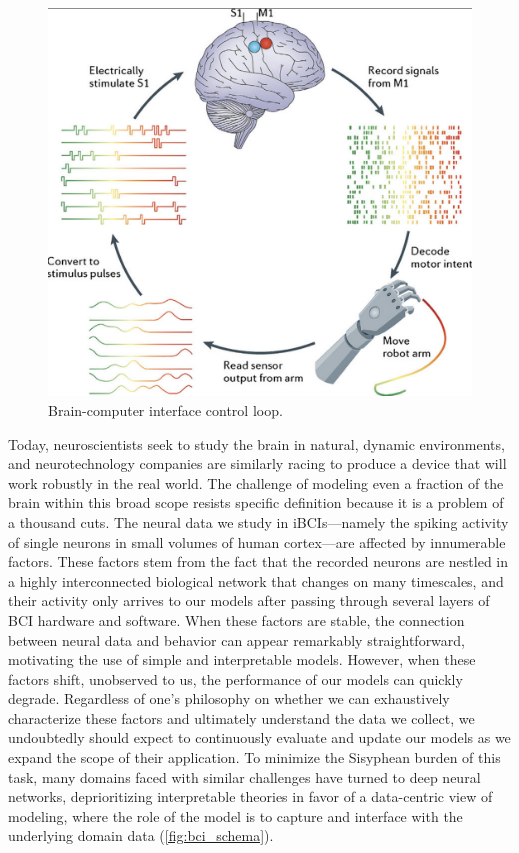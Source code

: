 \documentclass[12pt,oneside]{report}
\begin{document}
\begin{figure}[h]
  \centering
  \includegraphics[width=0.5\linewidth]{ch1_bci_loop.png}
  \caption{Brain-computer interface control loop.}
  \label{fig:bci_loop}
\end{figure}

Today, neuroscientists seek to study the brain in natural, dynamic environments, and neurotechnology companies are similarly racing to produce a device that will work robustly in the real world. The challenge of modeling even a fraction of the brain within this broad scope resists specific definition because it is a problem of a thousand cuts. The neural data we study in iBCIs---namely the spiking activity of single neurons in small volumes of human cortex---are affected by innumerable factors. These factors stem from the fact that the recorded neurons are nestled in a highly interconnected biological network that changes on many timescales, and their activity only arrives to our models after passing through several layers of BCI hardware and software. When these factors are stable, the connection between neural data and behavior can appear remarkably straightforward, motivating the use of simple and interpretable models. However, when these factors shift, unobserved to us, the performance of our models can quickly degrade. Regardless of one’s philosophy on whether we can exhaustively characterize these factors and ultimately understand the data we collect, we undoubtedly should expect to continuously evaluate and update our models as we expand the scope of their application. To minimize the Sisyphean burden of this task, many domains faced with similar challenges have turned to deep neural networks, deprioritizing interpretable theories in favor of a data-centric view of modeling, where the role of the model is to capture and interface with the underlying domain data (\cref{fig:bci_schema}).
\end{document}
